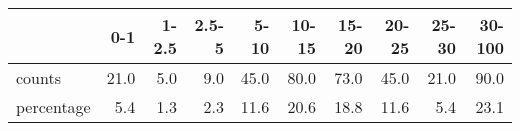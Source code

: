 \begin{table}[ht]
\centering
\begin{tabular}{lrrrrrrrrr}
  \hline
 & 0-1 & 1-2.5 & 2.5-5 & 5-10 & 10-15 & 15-20 & 20-25 & 25-30 & 30-100 \\ 
  \hline
counts & 21.0 & 5.0 & 9.0 & 45.0 & 80.0 & 73.0 & 45.0 & 21.0 & 90.0 \\ 
  percentage & 5.4 & 1.3 & 2.3 & 11.6 & 20.6 & 18.8 & 11.6 & 5.4 & 23.1 \\ 
   \hline
\end{tabular}
\end{table}
